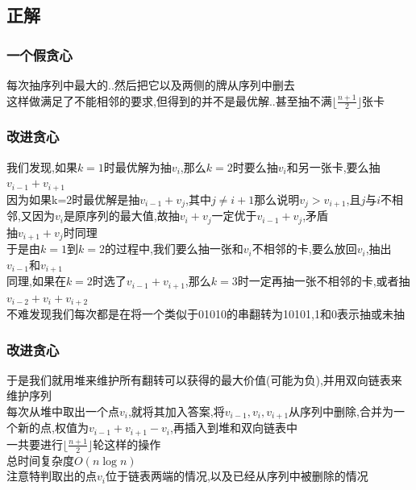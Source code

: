\documentclass{beamer}
\begin{document}
		\subsection{正解}
			\begin{frame}\frametitle{一个假贪心}
				每次抽序列中最大的..然后把它以及两侧的牌从序列中删去\\
				这样做满足了不能相邻的要求,但得到的并不是最优解..甚至抽不满$\lfloor\frac{n+1}{2}\rfloor$张卡
			\end{frame}
			\begin{frame}\frametitle{改进贪心}
				我们发现,如果$k=1$时最优解为抽$v_i$,那么$k=2$时要么抽$v_i$和另一张卡,要么抽$v_{i-1}+v_{i+1}$\\
				因为如果k=2时最优解是抽$v_{i-1}+v_j$,其中$j\neq i+1$那么说明$v_j>v_{i+1}$,且$j$与$i$不相邻,又因为$v_i$是原序列的最大值,故抽$v_i+v_j$一定优于$v_{i-1}+v_j$,矛盾\\
				抽$v_{i+1}+v_j$时同理\\
				于是由$k=1$到$k=2$的过程中,我们要么抽一张和$v_i$不相邻的卡,要么放回$v_i$,抽出$v_{i-1}$和$v_{i+1}$\\
				同理,如果在$k=2$时选了$v_{i-1}+v_{i+1}$,那么$k=3$时一定再抽一张不相邻的卡,或者抽$v_{i-2}+v_i+v_{i+2}$\\
				不难发现我们每次都是在将一个类似于01010的串翻转为10101,1和0表示抽或未抽\\
			\end{frame}
			\begin{frame}\frametitle{改进贪心}
				于是我们就用堆来维护所有翻转可以获得的最大价值(可能为负),并用双向链表来维护序列\\
				每次从堆中取出一个点$v_i$,就将其加入答案,将$v_{i-1},v_i,v_{i+1}$从序列中删除,合并为一个新的点,权值为$v_{i-1}+v_{i+1}-v_i$,再插入到堆和双向链表中\\
				一共要进行$\lfloor\frac{n+1}{2}\rfloor$轮这样的操作\\
				总时间复杂度$O(n\log n)$\\
				注意特判取出的点$v_i$位于链表两端的情况,以及已经从序列中被删除的情况
			\end{frame}
\end{document}
